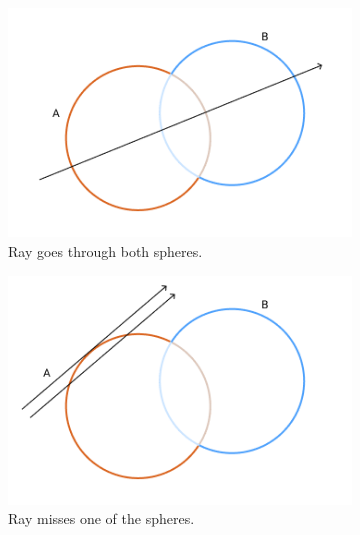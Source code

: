 \documentclass[a4paper,11pt,oneside]{article}
\begin{document}
\begin{figure}[ht]
     \centering
     \begin{subfigure}[b]{0.3\textwidth}
         \centering
         \includegraphics[width=\textwidth]{section3/3.4/sphere_union_case1.png}
         \caption{Ray goes through both spheres.}
         \label{sec3.4:union_case1}
     \end{subfigure}
     \hfill
     \begin{subfigure}[b]{0.3\textwidth}
         \centering
         \includegraphics[width=\textwidth]{section3/3.4/sphere_union_case2.png}
         \caption{Ray misses one of the spheres.}
          \label{sec3.4:union_case2}
     \end{subfigure}
     \hfill
     \begin{subfigure}[b]{0.3\textwidth}
         \centering

\end{subfigure}
\end{figure}
\end{document}
